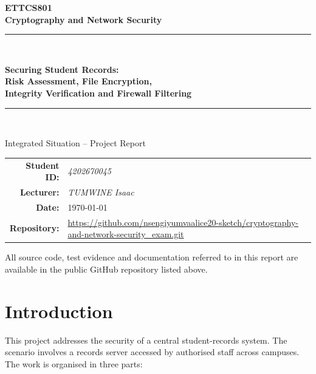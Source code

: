 \documentclass[11pt,a4paper]{article}
\begin{document}
\begin{titlepage}
\centering
\vspace*{2cm}
{\Large\bfseries ETTCS801\\[0.3cm] Cryptography and Network Security\par}
\vspace{1.2cm}
\rule{\textwidth}{1.2pt}\\[0.5cm]
{\Huge\bfseries Securing Student Records:\\[0.2cm]
Risk Assessment, File Encryption,\\[0.2cm]
Integrity Verification and Firewall Filtering\par}
\rule{\textwidth}{1.2pt}\\[1.5cm]

{\large Integrated Situation -- Project Report\par}
\vspace{2cm}

\begin{tabular}{rl}

  \textbf{Student ID:}  & \textit{4202670045} \\
  \textbf{Lecturer:}    & \textit{TUMWINE Isaac} \\
  \textbf{Date:}        & \today \\
  \textbf{Repository:}  & \url{https://github.com/nsengiyumvaalice20-sketch/cryptography-and-network-security_exam.git}
\end{tabular}

\vfill
{\small All source code, test evidence and documentation referred to in this report
are available in the public GitHub repository listed above.\par}
\end{titlepage}

\tableofcontents
\newpage

\section{Introduction}
This project addresses the security of a central student-records system.
The scenario involves a records server accessed by authorised staff across
campuses. The work is organised in three parts:
\end{document}
